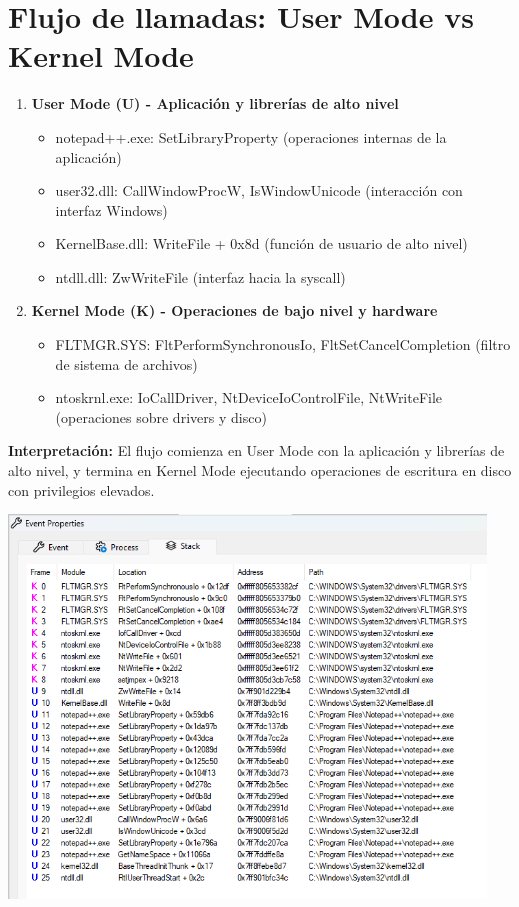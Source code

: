 \section*{Flujo de llamadas: User Mode vs Kernel Mode}

\begin{enumerate}
    \item \textbf{User Mode (U) - Aplicación y librerías de alto nivel}
    \begin{itemize}
        \item notepad++.exe: SetLibraryProperty (operaciones internas de la aplicación)
        \item user32.dll: CallWindowProcW, IsWindowUnicode (interacción con interfaz Windows)
        \item KernelBase.dll: WriteFile + 0x8d (función de usuario de alto nivel)
        \item ntdll.dll: ZwWriteFile (interfaz hacia la syscall)
    \end{itemize}

    \item \textbf{Kernel Mode (K) - Operaciones de bajo nivel y hardware}
    \begin{itemize}
        \item FLTMGR.SYS: FltPerformSynchronousIo, FltSetCancelCompletion (filtro de sistema de archivos)
        \item ntoskrnl.exe: IoCallDriver, NtDeviceIoControlFile, NtWriteFile (operaciones sobre drivers y disco)
    \end{itemize}
\end{enumerate}

\noindent
\textbf{Interpretación:} El flujo comienza en User Mode con la aplicación y librerías de alto nivel, y termina en Kernel Mode ejecutando operaciones de escritura en disco con privilegios elevados.

\begin{center}
    \includegraphics[width=0.95\textwidth]{figures/fig-syscall-path.png}
\end{center}